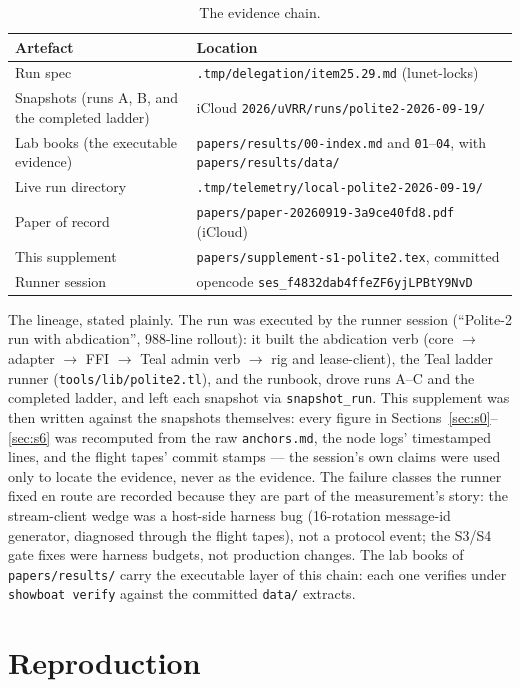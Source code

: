 \documentclass[10pt,journal,letterpaper]{IEEEtran}
\newcommand{\code}[1]{\texttt{\small #1}}
\begin{document}
\begin{table}[h]
\centering
\caption{The evidence chain.}
\label{tab:evidence}
\begin{tabular}{@{}ll@{}}
\toprule
Artefact & Location\\
\midrule
Run spec & \code{.tmp/delegation/item25.29.md} (lunet-locks)\\
Snapshots (runs A, B, and the completed ladder) & iCloud \code{2026/uVRR/runs/polite2-2026-09-19/}\\
Lab books (the executable evidence) & \code{papers/results/00-index.md} and \code{01}--\code{04}, with \code{papers/results/data/}\\
Live run directory & \code{.tmp/telemetry/local-polite2-2026-09-19/}\\
Paper of record & \code{papers/paper-20260919-3a9ce40fd8.pdf} (iCloud)\\
This supplement & \code{papers/supplement-s1-polite2.tex}, committed\\
Runner session & opencode \code{ses\_f4832dab4ffeZF6yjLPBtY9NvD}\\
\bottomrule
\end{tabular}
\end{table}

The lineage, stated plainly. The run was executed by the runner
session (``Polite-2 run with abdication'', 988-line rollout): it built
the abdication verb (core $\to$ adapter $\to$ FFI $\to$ Teal admin
verb $\to$ rig and lease-client), the Teal ladder runner
(\code{tools/lib/polite2.tl}), and the runbook, drove runs A--C and
the completed ladder, and left each snapshot via
\code{snapshot\_run}. This supplement was then written against the
snapshots themselves: every figure in
Sections~\ref{sec:s0}--\ref{sec:s6} was recomputed from the raw
\code{anchors.md}, the node logs' timestamped lines, and the flight
tapes' commit stamps --- the session's own claims were used only to
locate the evidence, never as the evidence. The failure classes the
runner fixed en route are recorded because they are part of the
measurement's story: the stream-client wedge was a host-side harness
bug (16-rotation message-id generator, diagnosed through the flight
tapes), not a protocol event; the S3/S4 gate fixes were harness
budgets, not production changes. The lab books of
\code{papers/results/} carry the executable layer of this chain:
each one verifies under \code{showboat verify} against the committed
\code{data/} extracts.

\section{Reproduction}
\label{sec:repro}
\end{document}
